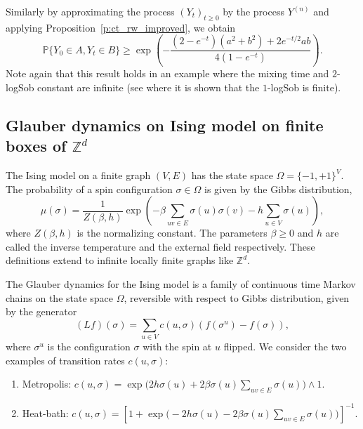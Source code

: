 \documentclass[11pt]{amsart}
\newcommand{\PP}{\mathbb{P}}
\newcommand{\tm}{t_{\mathrm{mix}}}
\newcommand{\1}{\mathbf{1}}
\theoremstyle{definition}
\theoremstyle{plain}
\theoremstyle{remark}
\numberwithin{equation}{section}
\begin{document}
Similarly by approximating the process $(Y_t)_{t \ge 0}$ by the process $Y^{(n)}$ and applying
Proposition~\ref{p:ct_rw_improved}, we obtain 
\[
\PP\{ Y_0 \in A, Y_t \in B \} \ge \exp \left(-\frac{(2-e^{-t})(a^2 + b^2)+2e^{-t/2}ab}{4(1- e^{-t})} \right).
\]
Note again that this result holds in an example where the mixing time and $2$-logSob constant are infinite (see \cite{BobLedoux98} where it is shown that the $1$-logSob is finite).




\subsection{Glauber dynamics on Ising model on finite boxes of $\mathbb Z^d$}\label{subset:ising} The Ising model on a finite graph $(V, E)$ has the state space $\Omega = \{ -1, +1\}^V$. The probability of a spin configuration $\sigma \in \Omega$ is given by the Gibbs distribution,
\[ \mu( \sigma)  = \frac{1}{Z(\beta, h)} \exp \left( -\beta \sum_{uv \in E }  \sigma(u) \sigma (v) - h \sum_{ u \in V} \sigma(u) \right),\]
where $Z(\beta, h)$ is the normalizing constant.  The parameters $\beta \ge 0$ and $h$ are called the inverse temperature and the external field respectively.
These definitions extend to infinite locally finite graphs like $\mathbb Z^d$.

The Glauber dynamics for the Ising model is a family of continuous time Markov chains on the state space $\Omega$, reversible with respect to Gibbs distribution, given by the generator
\[ (L f) (\sigma)  = \sum_{ u \in V} c(u, \sigma) ( f(\sigma^u) - f(\sigma)), \]
 where $\sigma^u$ is the configuration $\sigma$ with the spin at $u$ flipped. We consider the two examples of transition rates $c(u, \sigma)$:
 \begin{enumerate}
 \item Metropolis: $c(u, \sigma) = \exp \big(  2 h \sigma(u) + 2 \beta \sigma(u) \sum_{ uv \in E} \sigma(u) \big ) \wedge 1$.
 \item Heat-bath:  $c(u, \sigma) = \left [ 1+ \exp \big(  -2 h \sigma(u) - 2 \beta \sigma(u) \sum_{ uv \in E} \sigma(u) \big ) \right] ^{-1}$.
 \end{enumerate}
\end{document}
